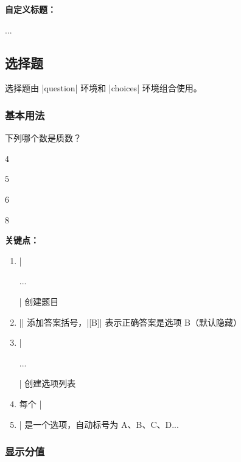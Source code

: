 \textbf{自定义标题：}

\begin{latexcode}
  \begin{notice}[label = {考生须知：}]
    \item ...
  \end{notice}
\end{latexcode}


\subsection{选择题}

选择题由 |question| 环境和 |choices| 环境组合使用。

\subsubsection{基本用法}

\begin{latexcode}
  \begin{question}
    下列哪个数是质数？\paren[B]
    \begin{choices}
      \item $4$
      \item $5$   %
      \item $6$
      \item $8$
    \end{choices}
  \end{question}
\end{latexcode}

\textbf{关键点：}
\begin{enumerate}
  \item |\begin{question}...\end{question}| 创建题目
  \item |\paren[B]| 添加答案括号，|[B]| 表示正确答案是选项 B（默认隐藏）
  \item |\begin{choices}...\end{choices}| 创建选项列表
  \item 每个 |\item| 是一个选项，自动标号为 A、B、C、D...
\end{enumerate}

\subsubsection{显示分值}

